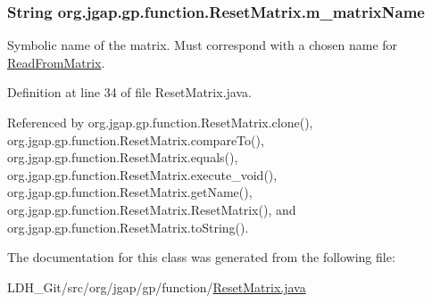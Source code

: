 \hypertarget{classorg_1_1jgap_1_1gp_1_1function_1_1_reset_matrix_a77577c227593cf97bd4f04b47e4a1aeb}{
\subsubsection[{m\-\_\-matrix\-Name}]{\setlength{\rightskip}{0pt plus 5cm}String org.\-jgap.\-gp.\-function.\-Reset\-Matrix.\-m\-\_\-matrix\-Name\hspace{0.3cm}{\ttfamily [private]}}}\label{classorg_1_1jgap_1_1gp_1_1function_1_1_reset_matrix_a77577c227593cf97bd4f04b47e4a1aeb}
Symbolic name of the matrix. Must correspond with a chosen name for \hyperlink{classorg_1_1jgap_1_1gp_1_1function_1_1_read_from_matrix}{Read\-From\-Matrix}. 

Definition at line 34 of file Reset\-Matrix.\-java.



Referenced by org.\-jgap.\-gp.\-function.\-Reset\-Matrix.\-clone(), org.\-jgap.\-gp.\-function.\-Reset\-Matrix.\-compare\-To(), org.\-jgap.\-gp.\-function.\-Reset\-Matrix.\-equals(), org.\-jgap.\-gp.\-function.\-Reset\-Matrix.\-execute\-\_\-void(), org.\-jgap.\-gp.\-function.\-Reset\-Matrix.\-get\-Name(), org.\-jgap.\-gp.\-function.\-Reset\-Matrix.\-Reset\-Matrix(), and org.\-jgap.\-gp.\-function.\-Reset\-Matrix.\-to\-String().



The documentation for this class was generated from the following file\-:\begin{DoxyCompactItemize}
\item 
L\-D\-H\-\_\-\-Git/src/org/jgap/gp/function/\hyperlink{_reset_matrix_8java}{Reset\-Matrix.\-java}\end{DoxyCompactItemize}
